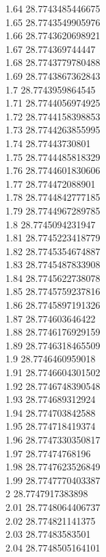 {1.64	28.7743485446675\\
1.65	28.7743549905976\\
1.66	28.7743620698921\\
1.67	28.774369744447\\
1.68	28.7743779780488\\
1.69	28.7743867362843\\
1.7	28.7743959864545\\
1.71	28.7744056974925\\
1.72	28.7744158398853\\
1.73	28.7744263855995\\
1.74	28.77443730801\\
1.75	28.7744485818329\\
1.76	28.7744601830606\\
1.77	28.774472088901\\
1.78	28.7744842777185\\
1.79	28.7744967289785\\
1.8	28.7745094231947\\
1.81	28.7745223418779\\
1.82	28.7745354674887\\
1.83	28.7745487833908\\
1.84	28.7745622738078\\
1.85	28.7745759237816\\
1.86	28.7745897191326\\
1.87	28.774603646422\\
1.88	28.7746176929159\\
1.89	28.7746318465509\\
1.9	28.7746460959018\\
1.91	28.7746604301502\\
1.92	28.7746748390548\\
1.93	28.774689312924\\
1.94	28.774703842588\\
1.95	28.774718419374\\
1.96	28.7747330350817\\
1.97	28.77474768196\\
1.98	28.7747623526849\\
1.99	28.7747770403387\\
2	28.7747917383898\\
2.01	28.7748064406737\\
2.02	28.774821141375\\
2.03	28.77483583501\\
2.04	28.7748505164101\\
}
